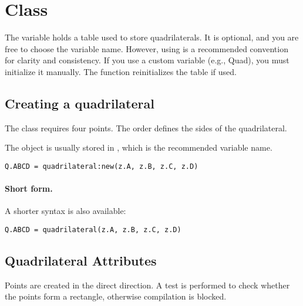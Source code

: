 \newpage
\section{Class } %

\vspace{1em}
The variable  holds a table used to store quadrilaterals. It is optional, and you are free to choose the variable name. However, using  is a recommended convention for clarity and consistency. If you use a custom variable (e.g., Quad), you must initialize it manually. The  function reinitializes the  table if used.

\subsection{Creating a quadrilateral} %
\label{sub:creating_a_quadrilateral}

The  class requires four points. The order defines the sides of the quadrilateral. 

\medskip
The object is usually stored in , which is the recommended variable name.

\begin{mybox}
\begin{verbatim}
Q.ABCD = quadrilateral:new(z.A, z.B, z.C, z.D)
\end{verbatim}
\end{mybox}

\paragraph{Short form.}
A shorter syntax is also available:

\begin{mybox}
\begin{verbatim}
Q.ABCD = quadrilateral(z.A, z.B, z.C, z.D)
\end{verbatim}
\end{mybox}

\subsection{Quadrilateral Attributes} %
\label{sub:quadrilateral_attributes}

Points are created in the direct direction. A test is performed to check whether the points form a rectangle, otherwise compilation is blocked.


